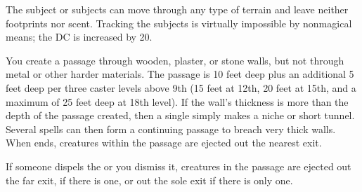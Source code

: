 \begin{spelleffect}
The subject or subjects can move through any type of terrain and leave neither footprints nor scent. Tracking the subjects is virtually impossible by nonmagical means; the DC is increased by 20.
\end{spelleffect}

\begin{spelleffect}
  You create a passage through wooden, plaster, or stone walls, but not through metal or other harder materials. The passage is 10 feet deep plus an additional 5 feet deep per three caster levels above 9th (15 feet at 12th, 20 feet at 15th, and a maximum of 25 feet deep at 18th level). If the wall's thickness is more than the depth of the passage created, then a single  simply makes a niche or short tunnel. Several  spells can then form a continuing passage to breach very thick walls. When  ends, creatures within the passage are ejected out the nearest exit.
\end{spelleffect}
\begin{spellnotes}
  If someone dispels the  or you dismiss it, creatures in the passage are ejected out the far exit, if there is one, or out the sole exit if there is only one.
\end{spellnotes}

